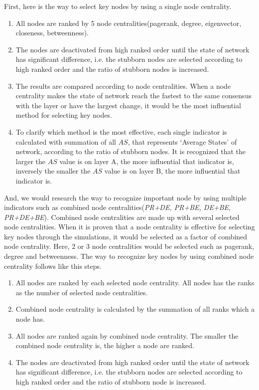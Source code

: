 First, here is the way to select key nodes by using a single node centrality.
\begin{enumerate}
	\item All nodes are ranked by 5 node centralities(pagerank, degree, eigenvector, closeness, betweenness).
	\item The nodes are deactivated from high ranked order until the state of network has significant difference, i.e. the stubborn nodes are selected according to high ranked order and the ratio of stubborn nodes is increased. 
	\item The results are compared according to node centralities. When a node centrality makes the state of network reach the fastest to the same consensus with the layer or have the largest change, it would be the most influential method for selecting key nodes.
	\item To clarify which method is the most effective, each single indicator is calculated with summation of all $AS$, that represents `Average States' of network, according to the ratio of stubborn nodes. It is recognized that the larger the $AS$ value is on layer A, the more influential that indicator is, inversely the smaller the $AS$ value is on layer B, the more influential that indicator is.
	
\end{enumerate}
And, we would research the way to recognize important node by using multiple indicators such as combined node centralities(\textit{PR+DE, PR+BE, DE+BE, PR+DE+BE}). Combined node centralities are made up with several selected node centralities. When it is proven that a node centrality is effective for selecting key nodes through the simulations, it would be selected as a factor of combined node centrality. Here, $2$ or $3$ node centralities would be selected such as pagerank, degree and betweenness. 
The way to recognize key nodes by using combined node centrality follows like this steps. 
\begin{enumerate}
	\item All nodes are ranked by each selected node centrality. All nodes has the ranks as the number of selected node centralities.  
	\item Combined node centrality is calculated by the summation of all ranks which a node has. 
	\item All nodes are ranked again by combined node centrality. The smaller the combined node centrality is, the higher a node are ranked.        
	\item The nodes are deactivated from high ranked order until the state of network has significant difference, i.e. the stubborn nodes are selected according to high ranked order and the ratio of stubborn node is increased. 
\end{enumerate}
